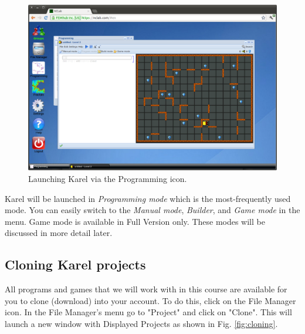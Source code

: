 \documentclass[article,A4,12pt]{llncs}
\begin{document}
\begin{figure}[!ht]
\begin{center}
\includegraphics[width=\textwidth]{img/init.png}
\end{center}
\caption{Launching Karel via the Programming icon.}
\label{fig:init}
\end{figure}
\noindent
Karel will be launched in {\em Programming mode} which is the most-frequently 
used mode. You can easily switch to the {\em Manual mode}, {\em Builder},
and {\em Game mode} in the menu. Game mode is available in Full Version only. 
These modes will be discussed in more detail later.

\subsection{Cloning Karel projects} \label{cloning}

All programs and games that we will work with in this course are
available for you to clone (download) into your account. To do this, 
click on the File Manager icon. In the File Manager's menu go to 
"Project" and click on "Clone". This will launch a new window with
Displayed Projects as shown in Fig. \ref{fig:cloning}.

\newpage
\end{document}
